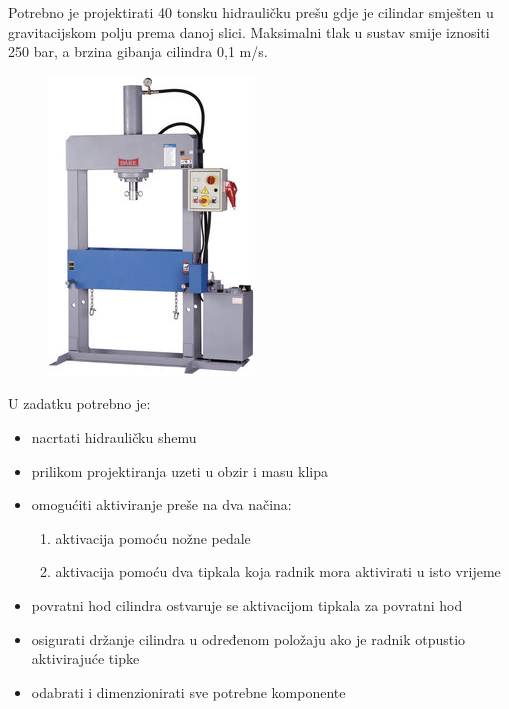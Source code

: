 \documentclass[zadatak]{FSBtex}
\begin{document}
\begin{SeminarAssignment}
Potrebno je projektirati 40 tonsku hidrauličku prešu gdje je cilindar smješten u gravitacijskom polju prema danoj slici. Maksimalni tlak u sustav smije iznositi 250 bar, a brzina gibanja cilindra 0,1 m/s.
\begin{figure}[!h]
\centering
\includegraphics[scale=2]{z1.png}
\end{figure}

\noindent U zadatku potrebno je:
\begin{itemize}
\setlength\itemsep{-.25em}
\item nacrtati hidrauličku shemu

\item prilikom projektiranja uzeti u obzir i masu klipa

\item omogućiti aktiviranje preše na dva načina:
\begin{enumerate}
\item aktivacija pomoću nožne pedale
\item aktivacija pomoću dva tipkala koja radnik mora aktivirati u isto vrijeme
\end{enumerate}

\item povratni hod cilindra ostvaruje se aktivacijom tipkala za povratni hod

\item osigurati držanje cilindra u određenom položaju ako je radnik otpustio aktivirajuće tipke
\item odabrati i dimenzionirati sve potrebne komponente
\end{itemize}

\end{SeminarAssignment}
\end{document}
